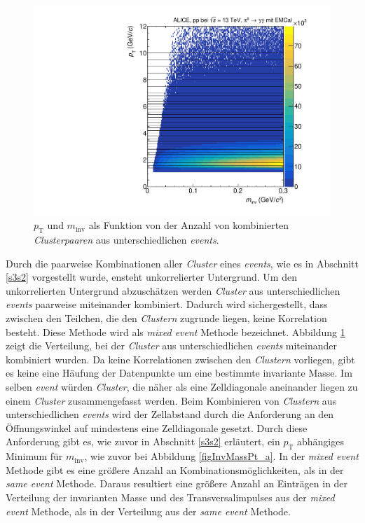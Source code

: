 \begin{figure}[t!]
\centering
\includegraphics[width=.7\linewidth]{hInvMass_pT_Bkg.pdf}
\caption{$p_\text{T}$ und $m_\text{inv}$ als Funktion von der Anzahl von kombinierten  \textit{Clusterpaaren} aus unterschiedlichen \textit{events}.}
\label{figInvMassPt_b}
\end{figure}
Durch die paarweise Kombinationen aller \textit{Cluster} eines \textit{events}, wie es in Abschnitt \ref{s3s2} vorgestellt wurde, ensteht unkorrelierter Untergrund.
Um den unkorrelierten Untergrund abzuschätzen werden \textit{Cluster} aus unterschiedlichen \textit{events} paarweise miteinander kombiniert.
Dadurch wird sichergestellt, dass zwischen den Teilchen, die den \textit{Clustern} zugrunde liegen, keine Korrelation besteht.
Diese Methode wird als \textit{mixed event} Methode bezeichnet.
Abbildung \ref{figInvMassPt_b} zeigt die Verteilung, bei der \textit{Cluster} aus unterschiedlichen \textit{events} miteinander kombiniert wurden.
Da keine Korrelationen zwischen den \textit{Clustern} vorliegen, gibt es keine eine Häufung der Datenpunkte um eine bestimmte invariante Masse.
\newline
Im selben \textit{event} würden \textit{Cluster}, die näher als eine Zelldiagonale aneinander liegen zu einem \textit{Cluster} zusammengefasst werden.
Beim Kombinieren von \textit{Clustern} aus unterschiedlichen \textit{events} wird der Zellabstand durch die Anforderung an den Öffnungswinkel auf mindestens eine Zelldiagonale gesetzt.
Durch diese Anforderung gibt es, wie zuvor in Abschnitt \ref{s3s2} erläutert, ein $p_\text{T}$ abhängiges Minimum für $m_\text{inv}$, wie zuvor bei Abbildung  \ref{figInvMassPt_a}.
\newline
In der \textit{mixed event} Methode gibt es eine größere Anzahl an Kombinationsmöglichkeiten, als in der \textit{same event} Methode.
Daraus resultiert eine größere Anzahl an Einträgen in der Verteilung der invarianten Masse und des Transversalimpulses aus der \textit{mixed event} Methode, als in der Verteilung aus der \textit{same event} Methode.
